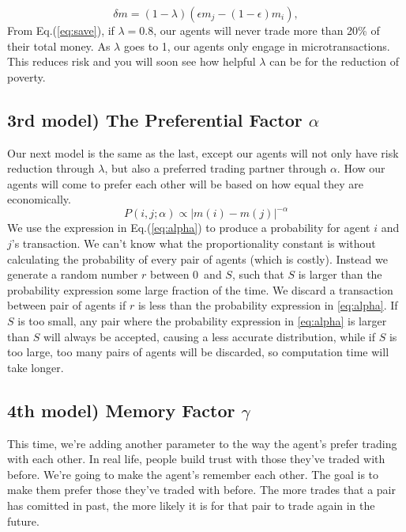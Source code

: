 \documentclass[10pt, a4paper]{article}
\begin{document}
\begin{equation}\label{eq:save}
  \delta m=(1-\lambda)(\epsilon m_j-(1-\epsilon)m_i),
\end{equation}
From Eq.(\ref{eq:save}), if $\lambda = 0.8$, our agents will never trade more than 20\% of their total money. 
As $\lambda$ goes to 1, our agents only engage in microtransactions. This reduces risk and you will soon see how helpful $\lambda$ can be for the reduction of poverty.

\subsection{3rd model) The Preferential Factor $\alpha$}
Our next model is the same as the last, except our agents will not only have risk reduction through $\lambda$, but also a preferred trading partner through $\alpha$.
How our agents will come to prefer each other will be based on how equal they are economically. 
\begin{equation}\label{eq:alpha}
 P(i,j;\alpha) \propto \left|m(i)-m(j) \right|^{-\alpha}
\end{equation}
We use the expression in Eq.(\ref{eq:alpha}) to produce a probability for agent $i$ and $j$'s transaction. We can't know what the proportionality constant is without
calculating the probability of every pair of agents (which is costly). Instead we generate a random number $r$ between $0$ and $S$, such that $S$ is larger than the probability expression
some large fraction of the time. We discard a transaction between pair of agents if $r$ is less than the probability expression in \eqref{eq:alpha}.
If $S$ is too small, any pair where the probability expression in \eqref{eq:alpha} is larger than $S$ will always be accepted, causing a less accurate distribution, while if $S$ is too large, too
many pairs of agents will be discarded, so computation time will take longer.

\subsection{4th model) Memory Factor $\gamma$} 
This time, we're adding another parameter to the way the agent's prefer trading with each other.
In real life, people build trust with those they've traded with before. We're going to make the agent's remember each other. The goal is to make them prefer those they've traded with before.
The more trades that a pair has comitted in past, the more likely it is for that pair to trade again in the future.
\end{document}
